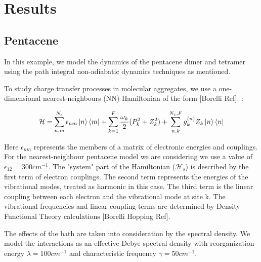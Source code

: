 
\chapter{Results} %

\label{Chapter6} %


\section{Pentacene}

In this example, we model the dynamics of the pentacene dimer and tetramer using the path integral non-adiabatic dynamics techniques as mentioned.

To study charge transfer processes in molecular aggregates, we use a one-dimensional nearest-neighbours (NN) Hamiltonian of the form [Borelli Ref]. :

\begin{equation} \label{6.x}    
    \mathcal{H} = \sum_{n, m}^{N_e} \epsilon_{nm} \ket{n} \bra{m} + \sum_{k = 1}^{F} \frac{\omega_k}{2} (P_k^{2} + Z_k^{2}) + \sum_{n, k}^{N_e, F} g_k^{(n)} Z_k \ket{n}\bra{n}
\end{equation}

Here $\epsilon_{nm}$ represents the members of a matrix of electronic energies and couplings. For the nearest-neighbour pentacene model we are considering we use a value of $\epsilon_{12} = 300 cm^{-1}$. The "system" part of the Hamiltonian ($\mathcal{H}_s$) is described by the first term of electron couplings. The second term represents the energies of the vibrational modes, treated as harmonic in this case. The third term is the linear coupling between each electron and the vibrational mode at site k. The vibrational frequencies and linear coupling terms are determined by Density Functional Theory calculations [Borelli Hopping Ref]. 

The effects of the bath are taken into consideration by the spectral density. We model the interactions as an effective Debye spectral density with reorganization energy $\lambda = 100 cm^{-1}$ and characteristic frequency $\gamma = 50 cm^{-1}$.

